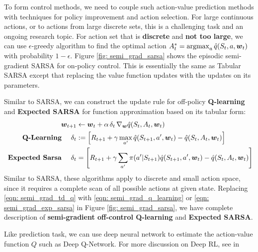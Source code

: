 \documentclass[11pt]{article}
\begin{document}
To form control methods, we need to couple such action-value prediction methods with techniques for policy improvement and action selection. For large continuous actions, or to actions from large discrete sets, this is a challenging task and an ongoing research topic. For action set that is \textbf{discrete} and \textbf{not too large}, we can use $\epsilon$-greedy algorithm to find the optimal action $A_{t}^{*} = \operatorname{argmax}_{a} \hat{q}(S_{t}, a, \boldsymbol{w}_{t})$ with probability $1-\epsilon$.  Figure \ref{fig: semi_grad_sarsa} shows the episodic semi-gradient SARSA for on-policy control. This is essentially the same as Tabular SARSA except that replacing the value function updates with the updates on its parameters. 

Similar to SARSA, we can construct the update rule for off-policy \textbf{Q-learning} and \textbf{Expected SARSA} for function approximation based on its tabular form:
\begin{align}
\boldsymbol{w}_{t+1} &\leftarrow  \boldsymbol{w}_{t} + \alpha\, \delta_{t}\,\nabla_{\boldsymbol{w}}{\hat{q}(S_{t}, A_{t}, \boldsymbol{w}_{t})}  \nonumber\\
\text{  \textbf{Q-Learning} }\quad \delta_{t}&:=\left[R_{t+1} + \gamma \max_{a'}\hat{q}(S_{t+1}, a', \boldsymbol{w}_{t}) - \hat{q}(S_{t}, A_{t}, \boldsymbol{w}_{t})\right]   \label{eqn: semi_grad_q_learning}\\
 \text{  \textbf{Expected Sarsa} }\quad \delta_{t} &= \left[R_{t+1} +\gamma\sum_{a'}\pi(a'|S_{t+1})\hat{q}(S_{t+1}, a', \boldsymbol{w}_{t}) - \hat{q}(S_{t}, A_{t}, \boldsymbol{w}_{t})\right]  \label{eqn: semi_grad_exp_sarsa} 
\end{align} Similar to SARSA, these algorithms apply to discrete and small action space, since it requires a complete scan of all possible actions at given state. Replacing \eqref{eqn: semi_grad_td_q} with \eqref{eqn: semi_grad_q_learning} or \eqref{eqn: semi_grad_exp_sarsa} in Figure \ref{fig: semi_grad_sarsa}, we have complete description of \textbf{semi-gradient off-control Q-learning} and \textbf{Expected SARSA}.   

Like prediction task, we can use deep neural network to estimate the action-value function $Q$ such as Deep Q-Network. For more discussion on Deep RL, see in \citep{franccois2018introduction}
\end{document}
